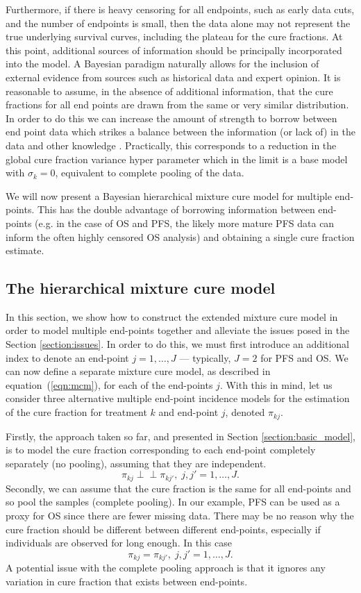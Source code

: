 \documentclass[AMA,STIX1COL]{WileyNJD-v2}
\begin{document}
Furthermore, if there is heavy censoring for all endpoints, such as early data cuts, and the number of endpoints is small, then the data alone may not represent the true underlying survival curves, including the plateau for the cure fractions.
At this point, additional sources of information should be principally incorporated into the model. A Bayesian paradigm naturally allows for the inclusion of external evidence from sources such as historical data and expert opinion. It is reasonable to assume, in the absence of additional information, that the cure fractions for all end points are drawn from the same or very similar distribution. In order to do this we can increase the amount of strength to borrow between end point data which strikes a balance between the information (or lack of) in the data and other knowledge \cite{Nikolaidis2021}. Practically, this corresponds to a reduction in the global cure fraction variance hyper parameter which in the limit is a base model with $\sigma_k=0$, equivalent to complete pooling of the data. 

We will now present a Bayesian hierarchical mixture cure model for multiple end-points.
This has the double advantage of borrowing information between end-points
(e.g. in the case of OS and PFS, the likely more mature PFS data can inform the often highly censored OS analysis) and obtaining a single cure fraction estimate.

%
\subsection{The hierarchical mixture cure model} \label{section:hier_model}
In this section, we show how to construct the extended mixture cure model in order to model multiple end-points together and alleviate the issues posed in the Section \ref{section:issues}.
In order to do this, we must first introduce an additional index to denote an end-point $j = 1, \ldots, J$ --- typically, $J=2$ for PFS and OS.
We can now define a separate mixture cure model, as described in equation~(\ref{eqn:mcm}), for each of the end-points $j$.
With this in mind, let us consider three alternative multiple end-point incidence models for the estimation of the cure fraction for treatment $k$ and end-point $j$, denoted $\pi_{kj}$.

Firstly, the approach taken so far, and presented in Section \ref{section:basic_model}, is to model the cure fraction corresponding to each end-point completely separately (no pooling), assuming that they are independent.
$$
\pi_{kj} \perp\!\!\!\perp \pi_{kj'}, \; j,j' = 1, \ldots, J.
$$
Secondly, we can assume that the cure fraction is the same for all end-points and so pool the samples (complete pooling).
In our example, PFS can be used as a proxy for OS since there are fewer missing data.
There may be no reason why the cure fraction should be different between different end-points, especially if individuals are observed for long enough.
In this case
$$
\pi_{kj} = \pi_{kj'}, \; j,j' = 1, \ldots, J.
$$
A potential issue with the complete pooling approach is that it ignores any variation in cure fraction that exists between end-points.
\end{document}
